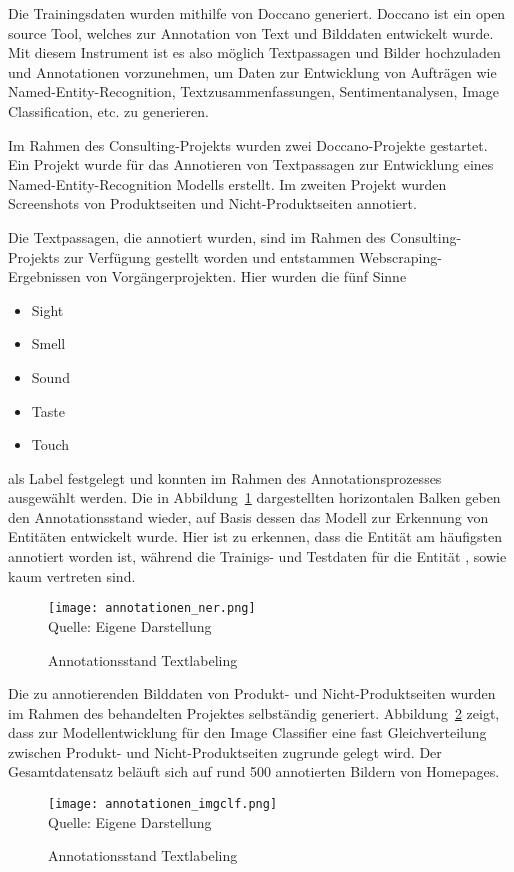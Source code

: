 Die Trainingsdaten wurden mithilfe von Doccano generiert.
Doccano ist ein open source Tool, welches zur Annotation von Text und Bilddaten entwickelt wurde.
Mit diesem Instrument ist es also möglich Textpassagen und Bilder hochzuladen und Annotationen vorzunehmen, um Daten zur
Entwicklung von Aufträgen wie Named-Entity-Recognition, Textzusammenfassungen, Sentimentanalysen, Image Classification, etc.
zu generieren.

Im Rahmen des Consulting-Projekts wurden zwei Doccano-Projekte gestartet.
Ein Projekt wurde für das Annotieren von Textpassagen zur Entwicklung eines Named-Entity-Recognition Modells erstellt.
Im zweiten Projekt wurden Screenshots von Produktseiten und Nicht-Produktseiten annotiert.

Die Textpassagen, die annotiert wurden, sind im Rahmen des Consulting-Projekts zur Verfügung gestellt worden und entstammen
Webscraping-Ergebnissen von Vorgängerprojekten.
Hier wurden die fünf Sinne
\begin{itemize}
	\item Sight
	\item Smell
	\item Sound
	\item Taste
	\item Touch
\end{itemize}
als Label festgelegt und konnten im Rahmen des Annotationsprozesses ausgewählt werden.
Die in Abbildung~\ref{fig:annotation_ner} dargestellten horizontalen Balken geben den Annotationsstand wieder, auf Basis dessen
das Modell zur Erkennung von Entitäten entwickelt wurde.
Hier ist zu erkennen, dass die Entität \grqq am häufigsten annotiert worden ist, während die Trainigs- und Testdaten für
die Entität \grqq, \grqq sowie \grqq kaum vertreten sind.
\begin{figure}[H]
	\caption{Annotationsstand Textlabeling}\label{fig:annotation_ner}
	\texttt{[image: annotationen\_ner.png]}
	\\
	Quelle: Eigene Darstellung
\end{figure}
Die zu annotierenden Bilddaten von Produkt- und Nicht-Produktseiten wurden im Rahmen des behandelten Projektes selbständig
generiert.
Abbildung~\ref{fig:annotation_imgclf} zeigt, dass zur Modellentwicklung für den Image Classifier eine fast Gleichverteilung zwischen Produkt-
und Nicht-Produktseiten zugrunde gelegt wird.
Der Gesamtdatensatz beläuft sich auf rund 500 annotierten Bildern von Homepages.
\begin{figure}[H]
	\caption{Annotationsstand Textlabeling}\label{fig:annotation_imgclf}
	\texttt{[image: annotationen\_imgclf.png]}
	\\
	Quelle: Eigene Darstellung
\end{figure}

